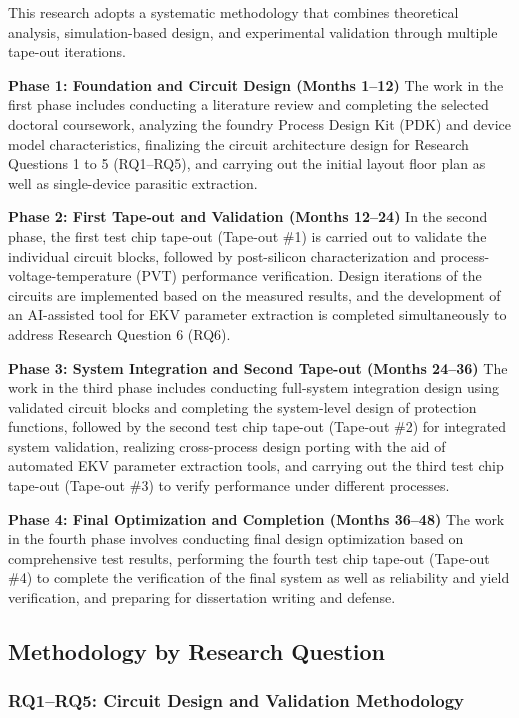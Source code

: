 \documentclass[12pt,a4paper]{article}
\begin{document}
This research adopts a systematic methodology that combines theoretical analysis, simulation-based design, and experimental validation through multiple tape-out iterations.

\textbf{Phase 1: Foundation and Circuit Design (Months 1--12)}
The work in the first phase includes conducting a literature review and completing the selected doctoral coursework, analyzing the foundry Process Design Kit (PDK) and device model characteristics, finalizing the circuit architecture design for Research Questions 1 to 5 (RQ1–RQ5), and carrying out the initial layout floor plan as well as single-device parasitic extraction.

\textbf{Phase 2: First Tape-out and Validation (Months 12--24)}
In the second phase, the first test chip tape-out (Tape-out \#1) is carried out to validate the individual circuit blocks, followed by post-silicon characterization and process-voltage-temperature (PVT) performance verification. Design iterations of the circuits are implemented based on the measured results, and the development of an AI-assisted tool for EKV parameter extraction is completed simultaneously to address Research Question 6 (RQ6).


\textbf{Phase 3: System Integration and Second Tape-out (Months 24--36)}
The work in the third phase includes conducting full-system integration design using validated circuit blocks and completing the system-level design of protection functions, followed by the second test chip tape-out (Tape-out \#2) for integrated system validation, realizing cross-process design porting with the aid of automated EKV parameter extraction tools, and carrying out the third test chip tape-out (Tape-out \#3) to verify performance under different processes.


\textbf{Phase 4: Final Optimization and Completion (Months 36--48)}
The work in the fourth phase involves conducting final design optimization based on comprehensive test results, performing the fourth test chip tape-out (Tape-out \#4) to complete the verification of the final system as well as reliability and yield verification, and preparing for dissertation writing and defense.

\subsection{Methodology by Research Question}

\subsubsection{RQ1--RQ5: Circuit Design and Validation Methodology}
\end{document}

